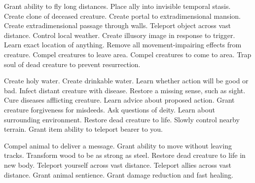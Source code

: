     {Grant ability to fly long distances.}
    {Place ally into invisible temporal stasis.}
    {Create clone of deceased creature.}
    {Create portal to extradimensional mansion.}
    {Create extradimensional passage through walls.}
    {Teleport object across vast distance.}
    {Control local weather.}
    {Create illusory image in response to trigger.}
    {Learn exact location of anything.}
    {Remove all movement-impairing effects from creature.}
    {Compel creatures to leave area.}
    {Compel creatures to come to area.}
    {Trap soul of dead creature to prevent resurrection.}

    {Create holy water.}
    {Create drinkable water.}
    {Learn whether action will be good or bad.}
    {Infect distant creature with disease.}
    {Restore a missing sense, such as sight.}
    {Cure diseases afflicting creature.}
    {Learn advice about proposed action.}
    {Grant creature forgiveness for misdeeds.}
    {Ask questions of deity.}
    {Learn about surrounding environment.}
    {Restore dead creature to life.}
    {Slowly control nearby terrain.}
    {Grant item ability to teleport bearer to you.}

    {Compel animal to deliver a message.}
    {Grant ability to move without leaving tracks.}
    {Transform wood to be as strong as steel.}
    {Restore dead creature to life in new body.}
    {Teleport yourself across vast distance.}
    {Teleport allies across vast distance.}
    {Grant animal sentience.}
    {Grant damage reduction and fast healing.}

